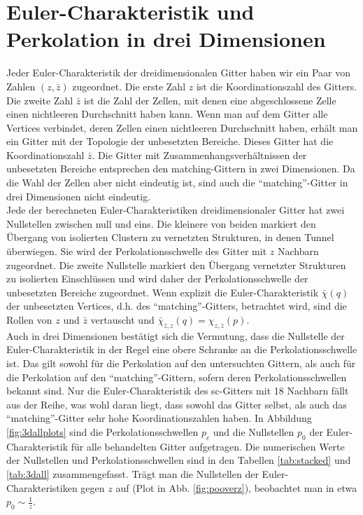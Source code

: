 \section{Euler-Charakteristik und Perkolation in drei Dimensionen}
Jeder Euler-Charakteristik der dreidimensionalen Gitter  haben wir ein Paar von Zahlen $(z,\bar{z})$ zugeordnet. Die erste Zahl $z$ ist die Koordinationszahl des Gitters. Die zweite Zahl $\bar{z}$ ist die Zahl der Zellen, mit denen eine abgeschlossene Zelle einen nichtleeren Durchschnitt haben kann. Wenn man auf dem Gitter alle Vertices verbindet, deren Zellen einen nichtleeren Durchschnitt haben, erh\"alt man ein Gitter mit der Topologie der unbesetzten Bereiche. Dieses Gitter hat die Koordinationszahl $\bar{z}$. Die Gitter mit Zusammenhangsverh\"altnissen der unbesetzten Bereiche entsprechen den matching-Gittern in zwei Dimensionen. Da die Wahl der Zellen aber nicht eindeutig ist, sind auch die ``matching''-Gitter in drei Dimensionen nicht eindeutig. 
\\Jede der berechneten Euler-Charakteristiken dreidimensionaler Gitter hat zwei Nullstellen zwischen null und eins. Die kleinere von beiden markiert den \"Ubergang von isolierten Clustern zu vernetzten Strukturen, in denen Tunnel \"uberwiegen. Sie wird der Perkolationsschwelle des Gitter mit $z$ Nachbarn zugeordnet.  Die zweite Nullstelle markiert den \"Ubergang vernetzter Strukturen zu isolierten Einschl\"ussen und wird daher der Perkolationsschwelle der unbesetzten Bereiche zugeordnet. Wenn explizit die Euler-Charakteristik $\bar{\chi}(q)$ der unbesetzten Vertices, d.h. des ``matching''-Gitters, betrachtet wird, sind die Rollen von $z$ und $\bar{z}$ vertauscht und $\bar{\chi}_{\bar{z},z}(q)=\chi_{z,\bar{z}}(p)$. 
\\Auch in drei Dimensionen best\"atigt sich die Vermutung, dass die Nullstelle der Euler-Charakteristik in der Regel eine obere Schranke an die Perkolationsschwelle ist. Das gilt sowohl f\"ur die Perkolation auf den untersuchten Gittern, als auch f\"ur die Perkolation auf den ``matching''-Gittern, sofern deren Perkolationsschwellen bekannt sind. Nur die Euler-Charakteristik des sc-Gitters mit 18 Nachbarn f\"allt aus der Reihe, was wohl daran liegt, dass sowohl das Gitter selbst, als auch das ``matching''-Gitter sehr hohe Koordinationszahlen haben. In Abbildung \ref{fig:3dallplots} sind die Perkolationsschwellen $p_c$ und die Nullstellen $p_0$ der Euler-Charakteristik f\"ur alle behandelten Gitter aufgetragen. Die numerischen Werte der Nullstellen und Perkolationsschwellen sind in den Tabellen \ref{tab:stacked} und \ref{tab:3dall} zusammengefasst. Tr\"agt man die Nullstellen der Euler-Charakteristiken gegen $z$ auf (Plot in Abb. \ref{fig:pooverz}), beobachtet man in etwa $p_0\sim \frac{1}{z}$.


